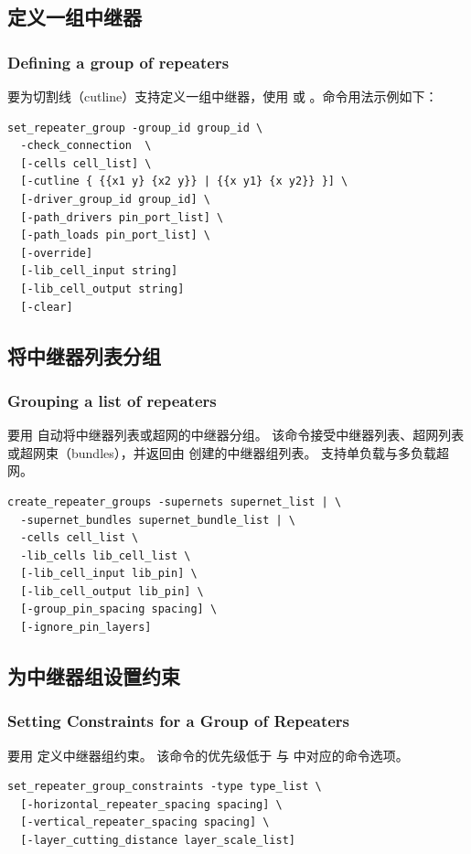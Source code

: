 \subsection{定义一组中继器}
\subsubsection*{Defining a group of repeaters}

要为切割线（cutline）支持定义一组中继器，使用  或 。命令用法示例如下：
\begin{lstlisting}
set_repeater_group -group_id group_id \
  -check_connection  \
  [-cells cell_list] \
  [-cutline { {{x1 y} {x2 y}} | {{x y1} {x y2}} }] \
  [-driver_group_id group_id] \
  [-path_drivers pin_port_list] \
  [-path_loads pin_port_list] \
  [-override]
  [-lib_cell_input string]
  [-lib_cell_output string]
  [-clear]
\end{lstlisting}

\subsection{将中继器列表分组}
\subsubsection*{Grouping a list of repeaters}

要用  自动将中继器列表或超网的中继器分组。
该命令接受中继器列表、超网列表或超网束（bundles），并返回由  创建的中继器组列表。
支持单负载与多负载超网。
\begin{lstlisting}
create_repeater_groups -supernets supernet_list | \
  -supernet_bundles supernet_bundle_list | \
  -cells cell_list \
  -lib_cells lib_cell_list \
  [-lib_cell_input lib_pin] \
  [-lib_cell_output lib_pin] \
  [-group_pin_spacing spacing] \
  [-ignore_pin_layers]
\end{lstlisting}

\subsection{为中继器组设置约束}
\subsubsection*{Setting Constraints for a Group of Repeaters}

要用  定义中继器组约束。
该命令的优先级低于 \cmd{add\_group\_repeaters} 与  中对应的命令选项。
\begin{lstlisting}
set_repeater_group_constraints -type type_list \
  [-horizontal_repeater_spacing spacing] \
  [-vertical_repeater_spacing spacing] \
  [-layer_cutting_distance layer_scale_list]
\end{lstlisting}


